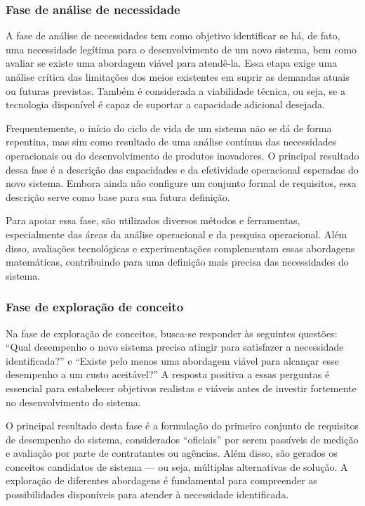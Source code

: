	\subsubsection*{Fase de análise de necessidade}

	A fase de análise de necessidades tem como objetivo identificar se há, de fato, uma necessidade legítima para o desenvolvimento de um novo sistema, bem como 
	avaliar se existe uma abordagem viável para atendê-la. Essa etapa exige uma análise crítica das limitações dos meios existentes em
	suprir as demandas atuais ou futuras previstas. Também é considerada a viabilidade técnica, ou seja, se a tecnologia disponível é capaz de suportar a 
	capacidade adicional desejada.

	Frequentemente, o início do ciclo de vida de um sistema não se dá de forma repentina, mas sim como resultado de uma análise contínua das necessidades 
	operacionais ou do desenvolvimento de produtos inovadores. O principal resultado dessa fase é a descrição das capacidades e da efetividade operacional 
	esperadas do novo sistema. Embora ainda não configure um conjunto formal de requisitos, essa 
	descrição serve como base para sua futura definição.

	Para apoiar essa fase, são utilizados diversos métodos e ferramentas, especialmente das áreas da análise operacional e da pesquisa operacional. Além disso, 
	avaliações tecnológicas e experimentações complementam essas abordagens matemáticas, contribuindo para uma definição mais precisa das necessidades do sistema.

	\subsubsection*{Fase de exploração de conceito}

	Na fase de exploração de conceitos, busca-se responder às seguintes questões: ``Qual desempenho o novo sistema precisa atingir para satisfazer a necessidade 
	identificada?'' e ``Existe pelo menos uma abordagem viável para alcançar esse desempenho a um custo aceitável?'' A resposta positiva a essas perguntas é essencial 
	para estabelecer objetivos realistas e viáveis antes de investir fortemente no desenvolvimento do sistema.

	O principal resultado desta fase é a formulação do primeiro conjunto de requisitos de desempenho do sistema, considerados ``oficiais'' por serem passíveis de 
	medição e avaliação por parte de contratantes ou agências. Além disso, são gerados os conceitos candidatos de sistema — ou seja, múltiplas alternativas de 
	solução. A exploração de diferentes abordagens é fundamental para compreender as possibilidades disponíveis para atender à necessidade identificada.

